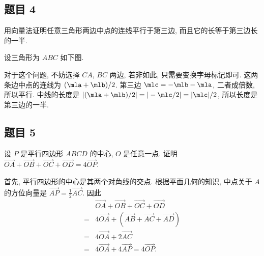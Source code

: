 \subsection*{ 题目 4 }
\begin{problem*}
用向量法证明任意三角形两边中点的连线平行于第三边, 而且它的长等于第三边长的一半.
\end{problem*}
\begin{solution}
设三角形为 $ABC$ 如下图.
\begin{figure}[htb]
\end{figure}
对于这个问题, 不妨选择 $CA$, $BC$ 两边, 若非如此, 只需要变换字母标记即可. 这两条边中点的连线为 $(\mla + \mlb) / 2$. 第三边 $\mlc = -\mlb - \mla$, 二者成倍数, 所以平行. 中线的长度是 $|(\mla + \mlb) / 2| = |-\mlc / 2| = |\mlc| / 2$, 所以长度是第三边的一半.
\end{solution}

\newcommand{\lvec}[1]{\overrightarrow{#1}}

\subsection*{ 题目 5 }
\begin{problem*}
设 $P$ 是平行四边形 $ABCD$ 的中心, $O$ 是任意一点. 证明 $\lvec{OA} + \lvec{OB} + \lvec{OC} + \lvec{OD} = 4\lvec{OP}$.
\end{problem*}
\begin{solution}
首先, 平行四边形的中心是其两个对角线的交点. 根据平面几何的知识, 中点关于 $A$ 的方位向量是 $\lvec{AP} = \frac{1}{2}\lvec{AC}$. 因此
\[
\begin{aligned}
     {} & \lvec{OA} + \lvec{OB} + \lvec{OC} + \lvec{OD} \\
    ={} & 4\lvec{OA} + (\lvec{AB} + \lvec{AC} + \lvec{AD}) \\
    ={} & 4\lvec{OA} + 2\lvec{AC} \\
    ={} & 4\lvec{OA} + 4\lvec{AP} = 4\lvec{OP}.
\end{aligned}
\]
\end{solution}

